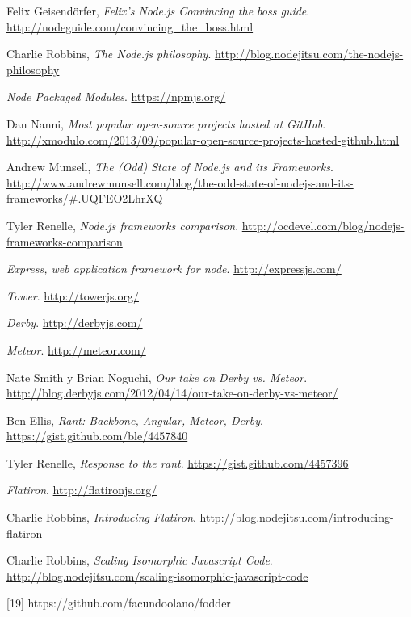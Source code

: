 \documentclass[doc,helv,longtable]{article}
\begin{document}
\begin{thebibliography}{150}
  Felix Geisendörfer,
  \emph{Felix's Node.js Convincing the boss guide}.
  \url{http://nodeguide.com/convincing_the_boss.html}

  Charlie Robbins,
  \emph{The Node.js philosophy}.
  \url{http://blog.nodejitsu.com/the-nodejs-philosophy}

  \emph{Node Packaged Modules}.
  \url{https://npmjs.org/}

  Dan Nanni, 
  \emph{Most popular open-source projects hosted at GitHub}.
  \url{http://xmodulo.com/2013/09/popular-open-source-projects-hosted-github.html}

  Andrew Munsell, 
  \emph{The (Odd) State of Node.js and its Frameworks}.
  \url{http://www.andrewmunsell.com/blog/the-odd-state-of-nodejs-and-its-frameworks/#.UQFEO2LhrXQ}

  Tyler Renelle, 
  \emph{Node.js frameworks comparison}.
  \url{http://ocdevel.com/blog/nodejs-frameworks-comparison}

  \emph{Express, web application framework for node}.
  \url{http://expressjs.com/}

  \emph{Tower}.
  \url{http://towerjs.org/}

  \emph{Derby}.
  \url{http://derbyjs.com/}

  \emph{Meteor}.
  \url{http://meteor.com/}

  Nate Smith y Brian Noguchi,
  \emph{Our take on Derby vs. Meteor}.
  \url{http://blog.derbyjs.com/2012/04/14/our-take-on-derby-vs-meteor/}

  Ben Ellis,
  \emph{Rant: Backbone, Angular, Meteor, Derby}.
  \url{https://gist.github.com/ble/4457840}

  Tyler Renelle,
  \emph{Response to the rant}.
  \url{https://gist.github.com/4457396}

  \emph{Flatiron}.
  \url{http://flatironjs.org/}

  Charlie Robbins,
  \emph{Introducing Flatiron}.
  \url{http://blog.nodejitsu.com/introducing-flatiron}

  Charlie Robbins,
  \emph{Scaling Isomorphic Javascript Code}.
  \url{http://blog.nodejitsu.com/scaling-isomorphic-javascript-code}



[19] https://github.com/facundoolano/fodder


\end{thebibliography}
\end{document}

